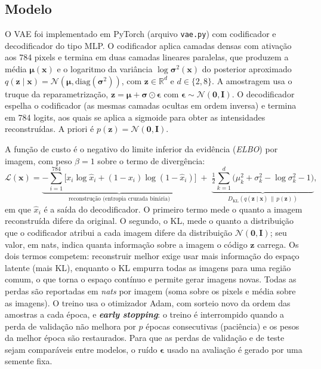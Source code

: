 \documentclass[11pt,a4paper]{article}
\begin{document}
\subsection{Modelo}
O VAE foi implementado em PyTorch (arquivo \texttt{vae.py}) com codificador e decodificador do tipo MLP. O codificador aplica camadas densas com ativação aos 784 pixels e termina em duas camadas lineares paralelas, que produzem a média $\boldsymbol{\mu}(\mathbf{x})$ e o logaritmo da variância $\log\boldsymbol{\sigma}^2(\mathbf{x})$ do posterior aproximado $q(\mathbf{z}\mid\mathbf{x})=\mathcal{N}(\boldsymbol{\mu},\mathrm{diag}(\boldsymbol{\sigma}^2))$, com $\mathbf{z}\in\mathbb{R}^{d}$ e $d\in\{2,8\}$. A amostragem usa o truque da reparametrização, $\mathbf{z}=\boldsymbol{\mu}+\boldsymbol{\sigma}\odot\boldsymbol{\epsilon}$ com $\boldsymbol{\epsilon}\sim\mathcal{N}(\mathbf{0},\mathbf{I})$. O decodificador espelha o codificador (as mesmas camadas ocultas em ordem inversa) e termina em 784 logits, aos quais se aplica a sigmoide para obter as intensidades reconstruídas. A priori é $p(\mathbf{z})=\mathcal{N}(\mathbf{0},\mathbf{I})$.

A função de custo é o negativo do limite inferior da evidência (\emph{ELBO}) por imagem, com peso $\beta=1$ sobre o termo de divergência:
\begin{equation}
\mathcal{L}(\mathbf{x}) = \underbrace{-\sum_{i=1}^{784}\Big[x_i\log\hat{x}_i+(1-x_i)\log(1-\hat{x}_i)\Big]}_{\text{reconstrução (entropia cruzada binária)}}
\;+\;
\underbrace{\tfrac{1}{2}\sum_{k=1}^{d}\Big(\mu_k^{2}+\sigma_k^{2}-\log\sigma_k^{2}-1\Big)}_{D_{\mathrm{KL}}\left(q(\mathbf{z}\mid\mathbf{x})\,\|\,p(\mathbf{z})\right)},
\end{equation}
em que $\hat{x}_i$ é a saída do decodificador. O primeiro termo mede o quanto a imagem reconstruída difere da original. O segundo, o KL, mede o quanto a distribuição que o codificador atribui a cada imagem difere da distribuição $\mathcal{N}(\mathbf{0},\mathbf{I})$; seu valor, em nats, indica quanta informação sobre a imagem o código $\mathbf{z}$ carrega. Os dois termos competem: reconstruir melhor exige usar mais informação do espaço latente (mais KL), enquanto o KL empurra todas as imagens para uma região comum, o que torna o espaço contínuo e permite gerar imagens novas. Todas as perdas são reportadas em \emph{nats} por imagem (soma sobre os pixels e média sobre as imagens). O treino usa o otimizador Adam, com sorteio novo da ordem das amostras a cada época, e \textbf{\emph{early stopping}}: o treino é interrompido quando a perda de validação não melhora por $p$ épocas consecutivas (paciência) e os pesos da melhor época são restaurados. Para que as perdas de validação e de teste sejam comparáveis entre modelos, o ruído $\boldsymbol{\epsilon}$ usado na avaliação é gerado por uma semente fixa.
\end{document}
